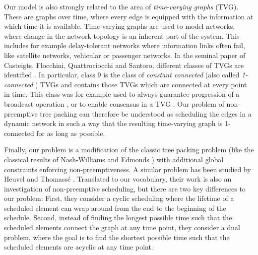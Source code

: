 \documentclass[runningheads]{llncs}
\newcommand{\lasse}[1]{#1}
\begin{document}
\lasse{Our model is also strongly related to the area of \emph{time-varying graphs} (TVG). These are graphs over time, where every edge is equipped with the information at which time it is available.
Time-varying graphs are used to model networks, where change in the network topology is an inherent part of the system. 
This includes for example delay-tolerant networks where information links often fail, like satellite networks, vehicular or passenger networks.
 In the seminal paper of Casteigts, Flocchini, Quattrociocchi and Santoro, different classes of TVGs are identified \cite{time-varying-graphs}. 
 In particular, class 9 is the class of \emph{constant connected} (also called \emph{1-connected} \cite{B-connected-1}) TVGs and contains those TVGs which are connected at every point in time. 
 This class was for example used to always guarantee progression of a broadcast operation \cite{o2005information}, or to enable consensus in a TVG \cite{kuhn2011coordinated}. Our problem of non-preemptive tree packing can therefore be understood as scheduling the edges in a dynamic network in such a way that the resulting time-varying graph is 1-connected 
 for as long as possible.}
 
 \lasse{
Finally, our problem is a modification of the classic tree packing problem (like the classical results of Nash-Williams \cite{Nash-Williams1961} and Edmonds \cite{edmonds1965minimum}) with additional global constraints enforcing non-preemptiveness. 
A similar problem has been studied by Heuvel and Thomassé \cite{van2012cyclic}.
 Translated to our vocabulary, their work is also an investigation of non-preemptive scheduling, but there are two key differences to our problem: First, they consider a cyclic scheduling where the lifetime of a scheduled element can wrap around from the end to the beginning of the schedule.
  Second, instead of finding the longest possible time such that the scheduled elements connect the graph at any time point, they consider a dual problem, where the goal is to find the shortest possible time such that the scheduled elements are acyclic at any time point. 
}
\end{document}

